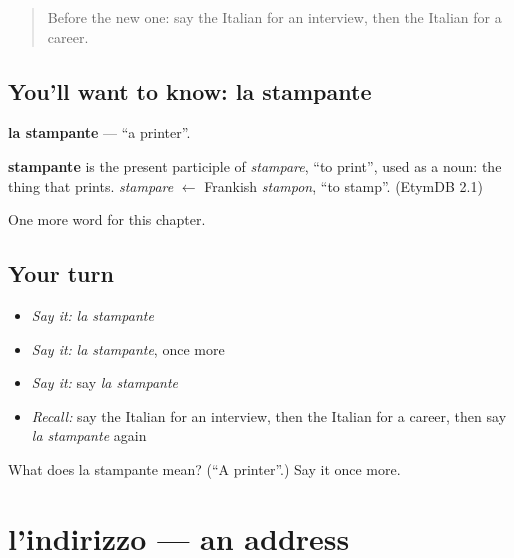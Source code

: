 \label{lesson:IT-C203-stampante}



\begin{quote}
Before the new one: say the Italian for an interview, then the Italian for a career.
\end{quote}

\subsection*{You'll want to know: la stampante}
\textbf{la stampante} — \textquotedblleft{}a printer\textquotedblright{}.

\begin{cousinweb}
\textbf{stampante} is the present participle of \emph{stampare}, \textquotedblleft{}to print\textquotedblright{}, used as a noun: the thing that prints. \emph{stampare} $\leftarrow$ Frankish \emph{stampon}, \textquotedblleft{}to stamp\textquotedblright{}. (EtymDB 2.1)
\end{cousinweb}

\begin{grammarlens}[title={What you've built}]
One more word for this chapter.
\end{grammarlens}

\subsection*{Your turn}
\begin{itemize}
\raggedright
  \item \emph{Say it:} \emph{la stampante}
  \item \emph{Say it:} \emph{la stampante}, once more
  \item \emph{Say it:} say \emph{la stampante}
  \item \emph{Recall:} say the Italian for an interview, then the Italian for a career, then say \emph{la stampante} again
\end{itemize}

\begin{tcolorbox}[breakable,colback=teal!4,colframe=teal!35!black,title={Before you move on}]
What does la stampante mean? (\textquotedblleft{}A printer\textquotedblright{}.) Say it once more.
\end{tcolorbox}
\section[l'indirizzo]{l'indirizzo — an address}

